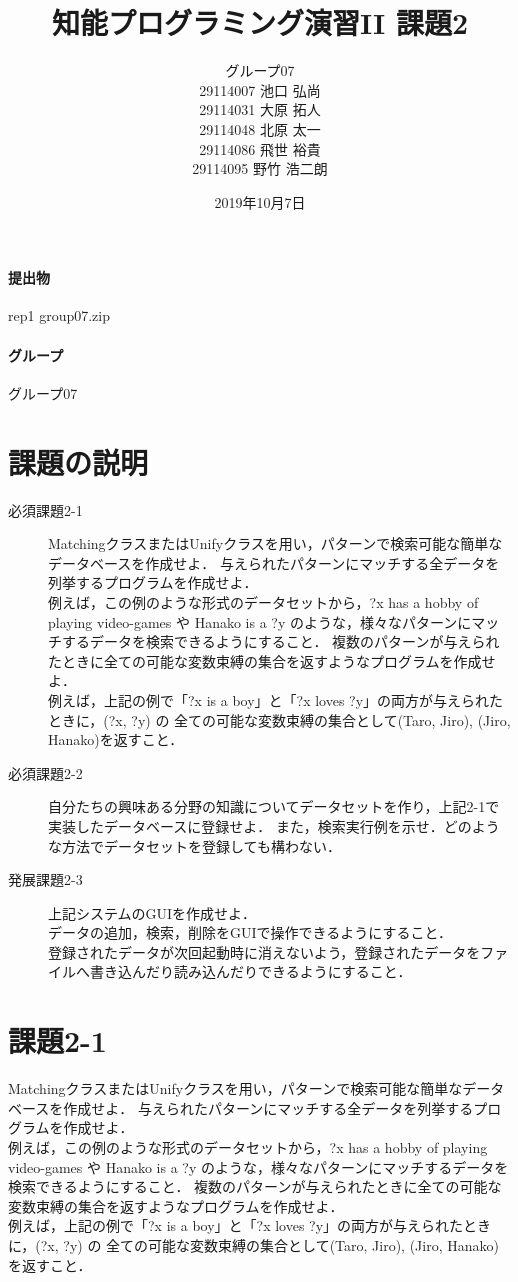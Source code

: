 \documentclass{jarticle}
\title{知能プログラミング演習II 課題2}
\author{グループ07\\
    29114007 池口 弘尚\\
    29114031 大原 拓人\\
    29114048 北原 太一\\
    29114086 飛世 裕貴\\
    29114095 野竹 浩二朗\\
}
\date{2019年10月7日}
\begin{document}
\maketitle

\paragraph{提出物} rep1 group07.zip
\paragraph{グループ} グループ07

\section{課題の説明}
\begin{description}
    \item[必須課題2-1] MatchingクラスまたはUnifyクラスを用い，パターンで検索可能な簡単なデータベースを作成せよ．
    与えられたパターンにマッチする全データを列挙するプログラムを作成せよ．
    \\ 例えば，この例のような形式のデータセットから，?x has a hobby of playing video-games や 
    Hanako is a ?y のような，様々なパターンにマッチするデータを検索できるようにすること．
    複数のパターンが与えられたときに全ての可能な変数束縛の集合を返すようなプログラムを作成せよ．
    \\ 例えば，上記の例で「?x is a boy」と「?x loves ?y」の両方が与えられたときに，(?x, ?y) の
    全ての可能な変数束縛の集合として{(Taro, Jiro), (Jiro, Hanako)}を返すこと．
    \item[必須課題2-2] 自分たちの興味ある分野の知識についてデータセットを作り，上記2-1で実装したデータベースに登録せよ．
    また，検索実行例を示せ．どのような方法でデータセットを登録しても構わない．
    \item[発展課題2-3] 上記システムのGUIを作成せよ．
    \\ データの追加，検索，削除をGUIで操作できるようにすること．
    \\ 登録されたデータが次回起動時に消えないよう，登録されたデータをファイルへ書き込んだり読み込んだりできるようにすること．
\end{description}


\section{課題2-1}
\begin{screen}
    MatchingクラスまたはUnifyクラスを用い，パターンで検索可能な簡単なデータベースを作成せよ．
    与えられたパターンにマッチする全データを列挙するプログラムを作成せよ．
    \\ 例えば，この例のような形式のデータセットから，?x has a hobby of playing video-games や 
    Hanako is a ?y のような，様々なパターンにマッチするデータを検索できるようにすること．
    複数のパターンが与えられたときに全ての可能な変数束縛の集合を返すようなプログラムを作成せよ．
    \\ 例えば，上記の例で「?x is a boy」と「?x loves ?y」の両方が与えられたときに，(?x, ?y) の
    全ての可能な変数束縛の集合として{(Taro, Jiro), (Jiro, Hanako)}を返すこと．
\end{screen}
\end{document}
